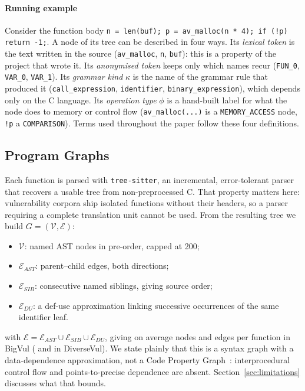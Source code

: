 \paragraph{Running example} Consider the function body
\texttt{n = len(buf); p = av\_malloc(n * 4); if (!p) return -1;}.
A node of its tree can be described in four ways. Its \emph{lexical token} is
the text written in the source (\texttt{av\_malloc}, \texttt{n}, \texttt{buf}):
this is a property of the project that wrote it. Its \emph{anonymised token}
keeps only which names recur (\texttt{FUN\_0}, \texttt{VAR\_0},
\texttt{VAR\_1}). Its \emph{grammar kind} $\kappa$ is the name of the grammar
rule that produced it (\texttt{call\_expression}, \texttt{identifier},
\texttt{binary\_expression}), which depends only on the C language. Its
\emph{operation type} $\phi$ is a hand-built label for what the node does to
memory or control flow (\texttt{av\_malloc(...)} is a \texttt{MEMORY\_ACCESS}
node, \texttt{!p} a \texttt{COMPARISON}). Terms used throughout the paper
follow these four definitions.

\subsection{Program Graphs}
\label{sec:graph_construction}

Each function is parsed with \texttt{tree-sitter}, an incremental,
error-tolerant parser that recovers a usable tree from non-preprocessed C.
That property matters here: vulnerability corpora ship isolated functions
without their headers, so a parser requiring a complete translation unit
cannot be used. From the resulting tree we build $G = (\mathcal{V},
\mathcal{E})$:

\begin{itemize}
    \item $\mathcal{V}$: named AST nodes in pre-order, capped at 200;
    \item $\mathcal{E}_{AST}$: parent--child edges, both directions;
    \item $\mathcal{E}_{SIB}$: consecutive named siblings, giving source order;
    \item $\mathcal{E}_{DU}$: a def-use approximation linking successive
          occurrences of the same identifier leaf.
\end{itemize}

with $\mathcal{E} = \mathcal{E}_{AST} \cup \mathcal{E}_{SIB} \cup
\mathcal{E}_{DU}$, giving on average \numbigvulNodes{} nodes and \numbigvulEdges{} edges per
function in BigVul (\numdiversevulNodes{} and \numdiversevulEdges{} in DiverseVul). We state plainly that this is a syntax graph with a data-dependence
approximation, not a Code Property Graph~\cite{yamaguchi2014modeling}:
interprocedural control flow and points-to-precise dependence are absent.
Section~\ref{sec:limitations} discusses what that bounds.

